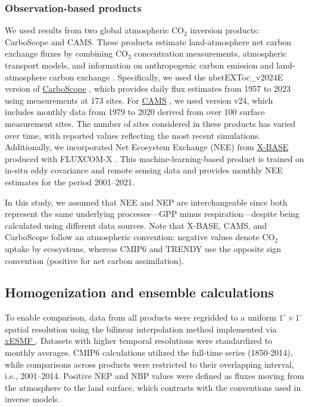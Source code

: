 \documentclass[9pt,twocolumn,twoside]{pnas-new}
\begin{document}
{%

\subsubsection*{Observation-based products}
We used results from two global atmospheric CO$_2$ inversion products: CarboScope and CAMS. These products estimate land-atmosphere net carbon exchange fluxes by combining CO$_2$ concentration measurements, atmospheric transport models, and information on anthropogenic carbon emission and land-atmosphere carbon exchange \citep{Kondo2022}. Specifically, we used the nbetEXToc\_v2024E version of \hyperlink{https://www.bgc-jena.mpg.de/CarboScope/?ID=nbetEXToc_v2024E}{CarboScope} \citep{Rodenbeck2005}, which provides daily flux estimates from 1957 to 2023 using measurements at 173 sites. For \hyperlink{https://ads.atmosphere.copernicus.eu/datasets/cams-global-greenhouse-gas-inversion?tab=overview}{CAMS} \citep{Chevallier2013}, we used version v24, which includes monthly data from 1979 to 2020 derived from over 100 surface measurement sites. The number of sites considered in these products has varied over time, with reported values reflecting the most recent simulations. Additionally, we incorporated Net Ecosystem Exchange (NEE) from \hyperlink{https://meta.icos-cp.eu/collections/zfwf1Ak2I7OlziGDTX8Xl6_T}{X-BASE} produced with FLUXCOM-X \citep{Nelson2024}. This machine-learning-based product is trained on in-situ eddy covariance and remote sensing data and provides monthly NEE estimates for the period 2001–2021.

In this study, we assumed that NEE and NEP are interchangeable since both represent the same underlying processes—GPP minus respiration—despite being calculated using different data sources. Note that X-BASE, CAMS, and CarboScope follow an atmospheric convention: negative values denote CO$_2$ uptake by ecosystems, whereas CMIP6 and TRENDY use the opposite sign convention (positive for net carbon assimilation).


\subsection*{Homogenization and ensemble calculations}
To enable comparison, data from all products were regridded to a uniform $1^\circ\times1^\circ$ spatial resolution using the bilinear interpolation method implemented via \hyperlink{https://xesmf.readthedocs.io/}{xESMF \citep{zhuang2023}}. Datasets with higher temporal resolutions were standardized to monthly averages. CMIP6 calculations utilized the full-time series (1850-2014), while comparisons across products were restricted to their overlapping interval, i.e., 2001–2014. Positive NEP and NBP values were defined as fluxes moving from the atmosphere to the land surface, which contrasts with the conventions used in inverse models.

}
\end{document}
